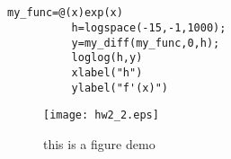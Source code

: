 \documentclass{article}
\begin{document}
      \subsection{}
        \begin{lstlisting}[caption = \mcode{Problem 2 answer}]
          my_func=@(x)exp(x)
          h=logspace(-15,-1,1000);
          y=my_diff(my_func,0,h);
          loglog(h,y)
          xlabel("h")
          ylabel("f'(x)")
        \end{lstlisting}

        \begin{figure}[ht]
          \centering
          \texttt{[image: hw2\_2.eps]}
          \caption{this is a figure demo}
          \label{fig:label}
        \end{figure}

 
\end{document}
